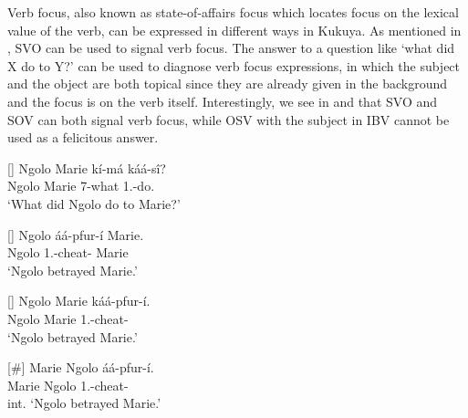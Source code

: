 \documentclass[output=paper,colorlinks,citecolor=brown,
]{langscibook}
\begin{document}
Verb focus, also known as state-of-affairs focus which locates focus on the lexical value of the verb, can be expressed in different ways in Kukuya. As mentioned in , SVO can be used to signal verb focus. The answer to a question like `what did X do to Y?' can be used to diagnose verb focus expressions, in which the subject and the object are both topical since they are already given in the background and the focus is on the verb itself. Interestingly, we see in  and  that SVO and SOV can both signal verb focus, while OSV with the subject in IBV cannot be used as a felicitous answer.
\begin{exe}
    \ex \label{49}
    \begin{xlist}
\ex
[]{
\label{49a}
\gll
Ngolo Marie kí-má káá-sî?\\
Ngolo Marie 7-what 1\Sm{}.\Pst{}-do.\Pst{}\\
\trans ‘What did Ngolo do to Marie?’
}

\ex
[]{
\label{49b}
\gll
Ngolo áá-pfur-í Marie.\\
Ngolo 1\Sm{}.\Pst{}-cheat-\Pst{} Marie\\
\trans ‘Ngolo betrayed Marie.’
}

\ex
[]{
\label{49c}
\gll
Ngolo Marie káá-pfur-í.\\
Ngolo Marie 1\Sm{}.\Pst{}-cheat-\Pst{}\\
\trans ‘Ngolo betrayed Marie.’
}

\ex
[\#]{
\label{49d}
\gll
Marie Ngolo áá-pfur-í.\\
Marie Ngolo 1\Sm{}.\Pst{}-cheat-\Pst{}\\
\trans int. ‘Ngolo betrayed Marie.’
}

    \end{xlist}
\end{exe}
\end{document}
